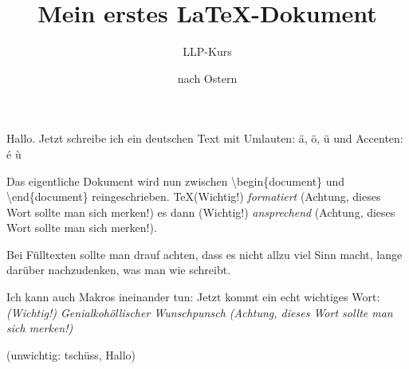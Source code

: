 \documentclass{scrartcl}
\title{Mein erstes \LaTeX-Dokument}
\author{LLP-Kurs}
\date{nach Ostern}
\newcommand{\wichtig}[1]{(Wichtig!) \emph{#1} (Achtung, dieses Wort sollte man sich merken!)}
\newcommand{\tb}{\textbackslash}
\newcommand{\unwichtig}[2][Tschau]{(unwichtig: #1, #2)}
\begin{document}
\maketitle
  Hallo. Jetzt schreibe ich ein deutschen Text mit Umlauten: ä, ö, ü und Accenten: é ù %

  Das eigentliche Dokument wird nun zwischen
  \tb begin\{document\} und \tb end\{document\}
  reingeschrieben. \TeX \wichtig{formatiert}
  es dann \wichtig{ansprechend}.

  Bei Fülltexten sollte man drauf achten, dass es nicht
  allzu viel Sinn macht, lange darüber nachzudenken, was
  man wie schreibt.

  Ich kann auch Makros ineinander tun: Jetzt kommt ein echt
  wichtiges Wort:
  \emph{\wichtig{Genialkohöllischer Wunschpunsch}}

  \unwichtig[tschüss]{Hallo}
\end{document}
